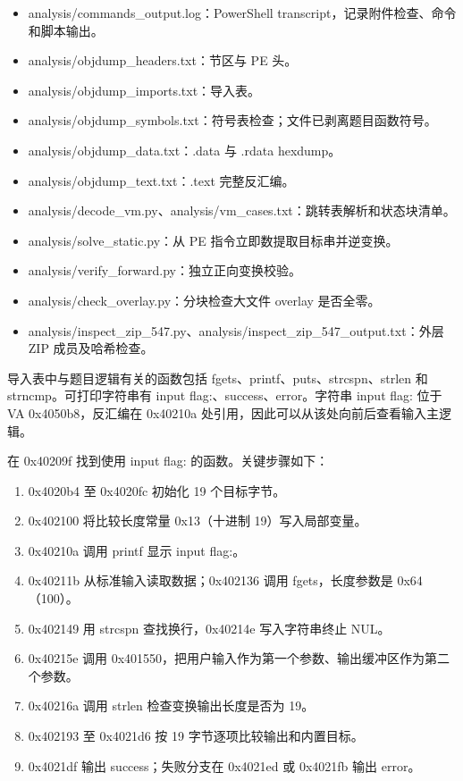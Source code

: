 \begin{itemize}
\tightlist
\item
  analysis/commands\_output.log：PowerShell transcript，记录附件检查、命令和脚本输出。
\item
  analysis/objdump\_headers.txt：节区与 PE 头。
\item
  analysis/objdump\_imports.txt：导入表。
\item
  analysis/objdump\_symbols.txt：符号表检查；文件已剥离题目函数符号。
\item
  analysis/objdump\_data.txt：.data 与 .rdata hexdump。
\item
  analysis/objdump\_text.txt：.text 完整反汇编。
\item
  analysis/decode\_vm.py、analysis/vm\_cases.txt：跳转表解析和状态块清单。
\item
  analysis/solve\_static.py：从 PE 指令立即数提取目标串并逆变换。
\item
  analysis/verify\_forward.py：独立正向变换校验。
\item
  analysis/check\_overlay.py：分块检查大文件 overlay 是否全零。
\item
  analysis/inspect\_zip\_547.py、analysis/inspect\_zip\_547\_output.txt：外层 ZIP 成员及哈希检查。
\end{itemize}

导入表中与题目逻辑有关的函数包括 fgets、printf、puts、strcspn、strlen 和 strncmp。可打印字符串有 input flag:、success、error。字符串 input flag: 位于 VA 0x4050b8，反汇编在 0x40210a 处引用，因此可以从该处向前后查看输入主逻辑。

在 0x40209f 找到使用 input flag: 的函数。关键步骤如下：

\begin{enumerate}
\def\labelenumi{\arabic{enumi}.}
\tightlist
\item
  0x4020b4 至 0x4020fc 初始化 19 个目标字节。
\item
  0x402100 将比较长度常量 0x13（十进制 19）写入局部变量。
\item
  0x40210a 调用 printf 显示 input flag:。
\item
  0x40211b 从标准输入读取数据；0x402136 调用 fgets，长度参数是 0x64（100）。
\item
  0x402149 用 strcspn 查找换行，0x40214e 写入字符串终止 NUL。
\item
  0x40215e 调用 0x401550，把用户输入作为第一个参数、输出缓冲区作为第二个参数。
\item
  0x40216a 调用 strlen 检查变换输出长度是否为 19。
\item
  0x402193 至 0x4021d6 按 19 字节逐项比较输出和内置目标。
\item
  0x4021df 输出 success；失败分支在 0x4021ed 或 0x4021fb 输出 error。
\end{enumerate}


